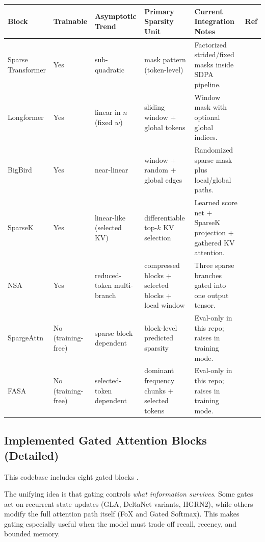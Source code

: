 \documentclass[11pt,a4paper]{article}
\begin{document}
\small
\begin{longtable}{p{2.5cm}p{1.6cm}p{1.9cm}p{2.4cm}p{4.1cm}p{1.5cm}}
\toprule
\textbf{Block} & \textbf{Trainable} & \textbf{Asymptotic Trend} & \textbf{Primary Sparsity Unit} & \textbf{Current Integration Notes} & \textbf{Ref} \\
\midrule
\endhead
Sparse Transformer & Yes & sub-quadratic & mask pattern (token-level) & Factorized strided/fixed masks inside SDPA pipeline. & \citep{child_sparse_transformer_2019} \\
Longformer & Yes & linear in $n$ (fixed $w$) & sliding window + global tokens & Window mask with optional global indices. & \citep{beltagy_longformer_2020} \\
BigBird & Yes & near-linear & window + random + global edges & Randomized sparse mask plus local/global paths. & \citep{zaheer_bigbird_2020} \\
SparseK & Yes & linear-like (selected KV) & differentiable top-$k$ KV selection & Learned score net + SparseK projection + gathered KV attention. & \citep{lou_sparsek_2024} \\
NSA & Yes & reduced-token multi-branch & compressed blocks + selected blocks + local window & Three sparse branches gated into one output tensor. & \citep{yuan_nsa_2025} \\
SpargeAttn & No (training-free) & sparse block dependent & block-level predicted sparsity & Eval-only in this repo; raises in training mode. & \citep{zhang_spargeattn_2025} \\
FASA & No (training-free) & selected-token dependent & dominant frequency chunks + selected tokens & Eval-only in this repo; raises in training mode. & \citep{wang_fasa_2026} \\
\bottomrule
\end{longtable}
\normalsize

\subsection{Implemented Gated Attention Blocks (Detailed)}
This codebase includes eight gated blocks \citep{yang_gla_2023,yang_deltanet_2024,yang_gated_deltanet_2024,hatamizadeh_gated_deltanet2_2026,sun_retentive_2023,qin_hgrn2_2024,lin_forgetting_transformer_2025,qiu_gated_attention_2025}.

The unifying idea is that gating controls \emph{what information survives}. Some gates act on recurrent state updates (GLA, DeltaNet variants, HGRN2), while others modify the full attention path itself (FoX and Gated Softmax). This makes gating especially useful when the model must trade off recall, recency, and bounded memory.
\end{document}
